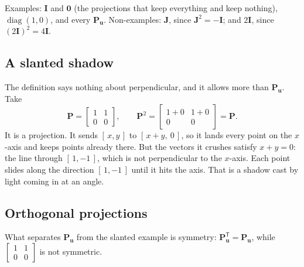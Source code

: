 \documentclass[11pt]{article}
\theoremstyle{plain}
\theoremstyle{definition}
\theoremstyle{remark}
\newcommand{\vc}[1]{\mathbf{#1}}
\newcommand{\mt}[1]{\mathbf{#1}}
\newcommand{\T}{^{\mathsf{T}}}
\DeclareMathOperator{\diagop}{diag}
\begin{document}
\noindent Examples: $\mt{I}$ and $\mt{0}$ (the projections that keep everything
and keep nothing), $\diagop(1,0)$, and every $\mt{P}_{\vc{u}}$. Non-examples:
$\mt{J}$, since $\mt{J}^{2}=-\mt{I}$; and $2\mt{I}$, since $(2\mt{I})^{2}=4\mt{I}$.

\subsection{A slanted shadow}
The definition says nothing about perpendicular, and it allows more than
$\mt{P}_{\vc{u}}$. Take
\[
  \mt{P}=\begin{bmatrix}1&1\\0&0\end{bmatrix},
  \qquad
  \mt{P}^{2}=\begin{bmatrix}1+0&1+0\\0&0\end{bmatrix}=\mt{P}.
\]
It is a projection. It sends $[\,x,y\,]$ to $[\,x+y,\ 0\,]$, so it lands every
point on the $x$-axis and keeps points already there. But the vectors it crushes
satisfy $x+y=0$: the line through $[\,1,-1\,]$, which is not perpendicular to
the $x$-axis. Each point slides along the direction $[\,1,-1\,]$ until it hits
the axis. That is a shadow cast by light coming in at an angle.

\begin{center}
\end{center}

\subsection{Orthogonal projections}
What separates $\mt{P}_{\vc{u}}$ from the slanted example is symmetry:
$\mt{P}_{\vc{u}}\T=\mt{P}_{\vc{u}}$, while
$\begin{bmatrix}1&1\\0&0\end{bmatrix}$ is not symmetric.
\end{document}
